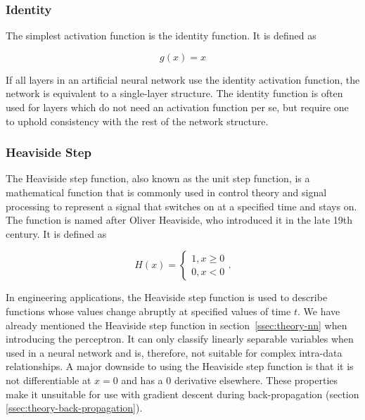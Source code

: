 \documentclass[draft,final]{vutinfth} %
\begin{document}
\subsubsection{Identity}
\label{sssec:theory-identity}

The simplest activation function is the identity function. It is defined as

\begin{equation}
  \label{eq:identity}
  g(x) = x
\end{equation}

If all layers in an artificial neural network use the identity
activation function, the network is equivalent to a single-layer
structure. The identity function is often used for layers which do not
need an activation function per se, but require one to uphold
consistency with the rest of the network structure.

\subsubsection{Heaviside Step}
\label{sssec:theory-heaviside}

The Heaviside step function, also known as the unit step function, is
a mathematical function that is commonly used in control theory and
signal processing to represent a signal that switches on at a
specified time and stays on. The function is named after Oliver
Heaviside, who introduced it in the late 19th century. It is defined
as

\begin{equation}
  \label{eq:heaviside}
  H(x) = 
  \begin{cases}
    1, x\geq 0 \\
    0, x < 0
  \end{cases}.
\end{equation}

In engineering applications, the Heaviside step function is used to
describe functions whose values change abruptly at specified values of
time $t$. We have already mentioned the Heaviside step function in
section~\ref{ssec:theory-nn} when introducing the perceptron. It can
only classify linearly separable variables when used in a neural
network and is, therefore, not suitable for complex intra-data
relationships. A major downside to using the Heaviside step function
is that it is not differentiable at $x = 0$ and has a $0$ derivative
elsewhere. These properties make it unsuitable for use with gradient
descent during back-propagation (section
\ref{ssec:theory-back-propagation}).
\end{document}
